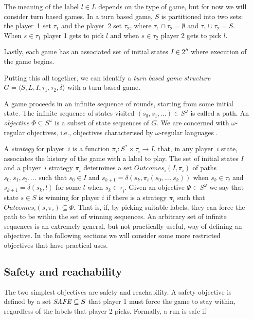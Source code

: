 The meaning of the label $l \in L$ depends on the type of game, but for now we will consider turn based games. In a turn based game, $S$ is partitioned into two sets: the player~1 set $\tau_1$ and the player~2 set $\tau_2$, where $\tau_1 \cap \tau_2 = \emptyset$ and $ \tau_1 \cup \tau_2 = S$. When $s \in \tau_1$ player 1 gets to pick $l$ and when $s \in \tau_2$ player 2 gets to pick $l$.

Lastly, each game has an associated set of initial states $I \in 2^S$ where execution of the game begins.

Putting this all together, we can identify a \emph{turn based game structure} $G = \langle S,L,I,\tau_1,\tau_2,\delta \rangle$ with a turn based game.

A game proceeds in an infinite sequence of rounds, starting from some initial state. The infinite sequence of states visited $(s_0, s_1,\ldots) \in S^\omega$ is called a path. An \emph{objective} $\Phi \subseteq S^\omega$ is a subset of state sequences of $G$. We are concerned with $\omega$-regular objectives, i.e., objectives characterised by $\omega$-regular languages \cite{omega_reg_lang}. 

A \emph{strategy} for player~$i$ is a function $\pi_i : S^* \times \tau_i \rightarrow L$ that, in any player~$i$ state, associates the history of the game with a label to play. The set of initial states $I$ and a player~$i$ strategy $\pi_i$ determines a set $Outcomes_i(I, \pi_i)$ of paths $s_0, s_1, s_2, ...$ such that $s_0 \in I$ and $s_{k+1} = \delta(s_k, \pi_i(s_0,...,s_k))$ when $s_k \in \tau_i$ and $s_{k+1} = \delta(s_k, l)$ for some $l$ when $s_k \in \tau_{\overline{i}}$.  Given an objective $\Phi \in S^\omega$ we say that state $s \in S$ is winning for player $i$ if there is a strategy $\pi_i$ such that $Outcomes_i({s}, \pi_i) \subseteq \Phi$. That is, if, by picking suitable labels, they can force the path to be within the set of winning sequences. An arbitrary set of infinite sequences is an extremely general, but not practically useful, way of defining an objective. In the following sections we will consider some more restricted objectives that have practical uses.

\subsection{Safety and reachability}

The two simplest objectives are safety and reachability. A safety objective is defined by a set $\mathit{SAFE} \subseteq S$ that player 1 must force the game to stay within, regardless of the labels that player 2 picks. Formally, a run is safe if 

